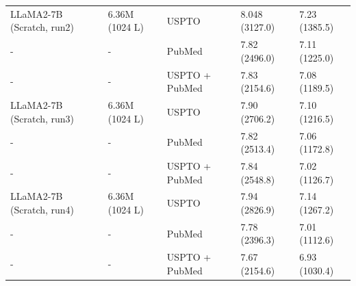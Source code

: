 \documentclass[10pt]{article} %
\begin{document}
\begin{table}[h]
\begin{tabularx}{1\textwidth}{lXXXX}
LLaMA2-7B (Scratch, run2) & 6.36M (1024 L) & USPTO  & 8.048 (3127.0) & 7.23 (1385.5) \\ %
- & - & PubMed & 7.82 (2496.0) & 7.11 (1225.0) \\ %
- & - & USPTO + PubMed & 7.83 (2154.6) & 7.08 (1189.5) \\ %
\hline

LLaMA2-7B (Scratch, run3) & 6.36M (1024 L) & USPTO  & 7.90 (2706.2) & 7.10 (1216.5) \\ %
- & - & PubMed & 7.82 (2513.4) & 7.06 (1172.8) \\ %
- & - & USPTO + PubMed & 7.84 (2548.8) & 7.02 (1126.7) \\ %
\hline

LLaMA2-7B (Scratch, run4) & 6.36M (1024 L) & USPTO  & 7.94 (2826.9) & 7.14 (1267.2) \\ %
- & - & PubMed & 7.78 (2396.3) & 7.01 (1112.6) \\ %
- & - & USPTO + PubMed & 7.67 (2154.6) & 6.93 (1030.4) \\ %
\hline



\bottomrule
\end{tabularx}
\label{tab:div_vs_ce_val}

\end{table}
\end{document}
